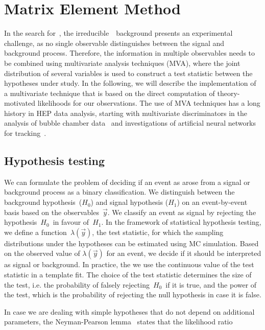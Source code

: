 \section{Matrix Element Method}
\label{sec:mem}
In the search for~\ttHbb, the irreducible~\ttbb~background presents an experimental challenge, as no single observable distinguishes between the signal and background process. Therefore, the information in multiple observables needs to be combined using multivariate analysis techniques (MVA), where the joint distribution of several variables is used to construct a test statistic between the hypotheses under study. In the following, we will describe the implementation of a multivariate technique that is based on the direct computation of theory-motivated likelihoods for our observations. The use of MVA techniques has a long history in HEP data analysis, starting with multivariate discriminators in the analysis of bubble chamber data~\cite{VanDoninck:1984wd} and investigations of artificial neural networks for tracking~\cite{Denby:1987rk}.

\subsection{Hypothesis testing}
\label{sec:test_statistic}
We can formulate the problem of deciding if an event as arose from a signal or background process as a binary classification. We distinguish between the background hypothesis~($H_0$) and signal hypothesis ($H_1$) on an event-by-event basis based on the observables~$\vec{y}$. We classify an event as signal by rejecting the hypothesis~$H_0$~in favour of~$H_1$. In the framework of statistical hypothesis testing, we define a function~$\lambda(\vec{y})$, the test statistic, for which the sampling distributions under the hypotheses can be estimated using MC simulation. Based on the observed value of $\lambda(\vec{y})$ for an event, we decide if it should be interpreted as signal or background. In practice, the we use the continuous value of the test statistic in a template fit. The choice of the test statistic determines the size of the test, i.e. the probability of falsely rejecting~$H_0$~if it is true, and the power of the test, which is the probability of rejecting the null hypothesis in case it is false.

In case we are dealing with simple hypotheses that do not depend on additional parameters, the Neyman-Pearson lemma~\cite{neyman1992problem} states that the likelihood ratio

